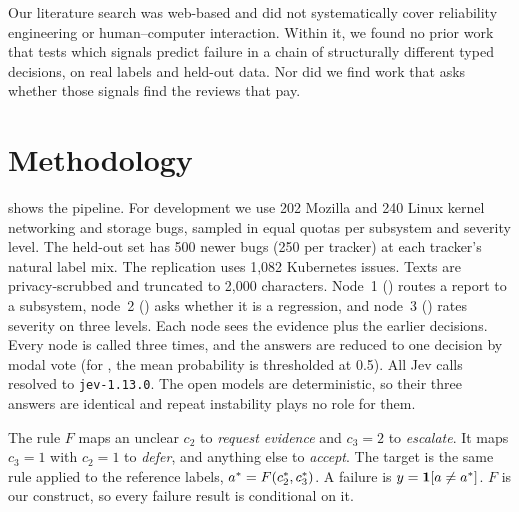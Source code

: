 Our literature search was web-based and did not systematically cover
reliability engineering or human--computer interaction. Within it, we found no prior work that tests which signals predict
failure in a chain of structurally different typed decisions, on real
labels and held-out data. Nor did we find work that asks whether those
signals find the reviews that pay.

\section{Methodology}
\label{sec:setting}

\begin{widefigure}
\centering
\resizebox{\linewidth}{!}{}
\caption{Study architecture. Reports from three public trackers are
cleaned and stripped of label leaks, then pass through three typed
decisions, each called three times and reduced by modal vote. An action
rule $F$ maps the second and third decisions to an action. Reference
labels, never shown to the model, give the target $\astar$ through the same rule. A failure is
$a \neq \astar$.}
\label{fig:arch}
\end{widefigure}

  shows the pipeline. For development we use 202 Mozilla and 240 Linux kernel networking and
storage bugs, sampled in equal quotas per subsystem and severity level.
The held-out set has 500 newer bugs (250 per tracker) at each tracker's
natural label mix. The replication uses 1{,}082 Kubernetes issues. Texts are
privacy-scrubbed and truncated to 2{,}000 characters. Node~1 (\choice{}) routes a report to a subsystem, node~2 (\noul{})
asks whether it is a regression, and node~3 (\score{}) rates severity on
three levels. Each
node sees the evidence plus the earlier decisions. Every node is called
three times, and the answers are reduced to one decision by modal vote
(for \noul{}, the mean probability is thresholded at 0.5). All Jev calls
resolved to \texttt{jev-1.13.0}. The open models are deterministic, so
their three answers are identical and repeat instability plays no role
for them.

 The rule $F$ maps an unclear $c_2$ to
\emph{request evidence} and $c_3 = 2$ to \emph{escalate}. It maps
$c_3 = 1$ with $c_2 = 1$ to \emph{defer}, and anything else to
\emph{accept}. The target is the same rule applied to the reference labels,
$a^{*} = F(c_2^{*}, c_3^{*})$. A failure is
$y = \mathbf{1}[a \neq a^{*}]$. $F$ is our construct,
so every failure result is conditional on it.

